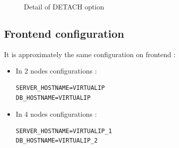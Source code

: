 \documentclass[a4paper,10pt]{report}
\begin{document}
\begin{figure}[!h]
  \caption{Detail of DETACH option}
  \label{fig:detach}
\end{figure}


\subsection{Frontend configuration}
\label{frontendconf}
It is approximately the same configuration on frontend :\\
\begin{itemize}
 \item In 2 nodes configurations :
\begin{lstlisting}
SERVER_HOSTNAME=VIRTUALIP
DB_HOSTNAME=VIRTUALIP
\end{lstlisting}
\item In 4 nodes configurations :
\begin{lstlisting}
SERVER_HOSTNAME=VIRTUALIP_1
DB_HOSTNAME=VIRTUALIP_2
\end{lstlisting}
\end{itemize}
\end{document}
